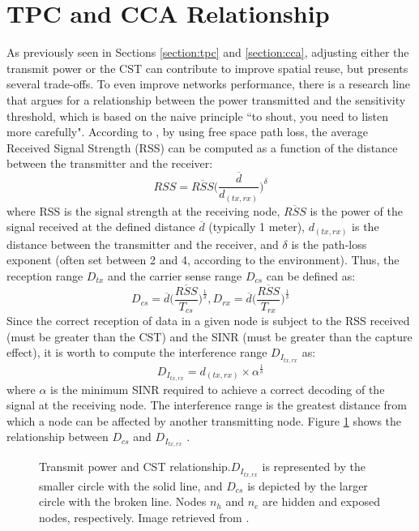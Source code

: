 \documentclass[12pt, a4paper,twoside]{tesi_upf}
\begin{document}
		\section{TPC and CCA Relationship}
		\label{section:tpc_cst_relationship}
			As previously seen in Sections \ref{section:tpc} and \ref{section:cca}, adjusting either the transmit power or the CST can contribute to improve spatial reuse, but presents several trade-offs. To even improve networks performance, there is a research line that argues for a relationship between the power transmitted and the sensitivity threshold, which is based on the naive principle ``to shout, you need to listen more carefully". According to \cite{thorpe2014survey}, by using free space path loss, the average Received Signal Strength (RSS) can be computed as a function of the distance between the transmitter and the receiver:		
			\begin{equation}
				RSS = \overline{RSS} \Big( \frac{\overline{d}}{d_{(tx,rx)}} \Big)^{\delta}
				\nonumber
			\end{equation}
			where RSS is the signal strength at the receiving node, $\overline{RSS}$ is the power of the signal received at the defined distance $\overline{d}$ (typically 1 meter), $d_{(tx,rx)}$ is the distance between the transmitter and the receiver, and $\delta$ is the path-loss exponent (often set between 2 and 4, according to the environment).  Thus, the reception range $D_{tx}$ and the carrier sense range $D_{cs}$ can be defined as:
			\begin{equation}
				D_{cs} = \overline{d} \Big( \frac{\overline{RSS}}{T_{cs}} \Big)^\frac{1}{\delta}, 				D_{rx} = \overline{d} \Big( \frac{\overline{RSS}}{T_{rx}} \Big)^\frac{1}{\delta}
				\nonumber
			\end{equation}
			Since the correct reception of data in a given node is subject to the RSS received (must be greater than the CST) and the SINR (must be greater than the capture effect), it is worth to compute the interference range $D_{I_{tx,rx}}$ as:					
			\begin{equation}
				D_{I_{tx,rx}} = d_{(tx,rx)} \times \alpha ^{\frac{1}{\delta}}
				\nonumber
			\end{equation}			
			where $\alpha$ is the minimum SINR required to achieve a correct decoding of the signal at the receiving node. The interference range is the greatest distance from which a node can be affected by another transmitting node. Figure \ref{fig:tx_cca_relation} shows the relationship between $D_{cs}$ and $D_{I_{tx,rx}}$ . 
			\begin{figure}[h!]
				\centering
				\caption{Transmit power and CST relationship.$D_{I_{tx,rx}}$ is represented by the smaller circle with the solid line, and $D_{cs}$ is depicted by the larger circle with the broken line. Nodes $n_h$ and $n_e$ are hidden and exposed nodes, respectively. Image retrieved from \cite{thorpe2014survey}.}
				\label{fig:tx_cca_relation}
			\end{figure}	
			
\end{document}
